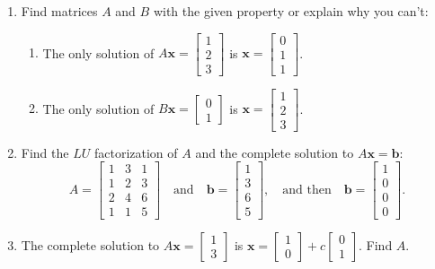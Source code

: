 \documentclass[14pt, a4paper]{article}
\begin{document}
\begin{enumerate}[resume]
    \item Find matrices $A$ and $B$ with the given property or explain why you can't:
          \begin{enumerate}
              \item The only solution of $A\mathbf{x} = \begin{bmatrix} 1 \\ 2 \\ 3 \end{bmatrix}$ is $\mathbf{x} = \begin{bmatrix} 0 \\ 1 \\ 1 \end{bmatrix}$.
              \item The only solution of $B\mathbf{x} = \begin{bmatrix} 0 \\ 1 \end{bmatrix}$ is $\mathbf{x} = \begin{bmatrix} 1 \\ 2 \\ 3 \end{bmatrix}$.
          \end{enumerate}

    \item Find the $LU$ factorization of $A$ and the complete solution to $A\mathbf{x} = \mathbf{b}$:
          \[
              A = \begin{bmatrix}
                  1 & 3 & 1 \\
                  1 & 2 & 3 \\
                  2 & 4 & 6 \\
                  1 & 1 & 5
              \end{bmatrix}
              \quad \text{and} \quad
              \mathbf{b} = \begin{bmatrix} 1 \\ 3 \\ 6 \\ 5 \end{bmatrix},
              \quad \text{and then} \quad
              \mathbf{b} = \begin{bmatrix} 1 \\ 0 \\ 0 \\ 0 \end{bmatrix}.
          \]

    \item The complete solution to $A\mathbf{x} = \begin{bmatrix} 1 \\ 3 \end{bmatrix}$ is $\mathbf{x} = \begin{bmatrix} 1 \\ 0 \end{bmatrix} + c \begin{bmatrix} 0 \\ 1 \end{bmatrix}$. Find $A$.
\end{enumerate}
\end{document}
